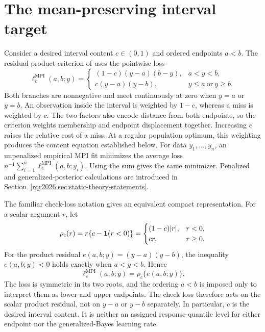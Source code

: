 \section{The mean-preserving interval target}
\label{rqr2026:sec:mpi-loss}

Consider a desired interval content \(c\in(0,1)\) and ordered endpoints
\(a<b\). The residual-product criterion of
\citet{rqr-PouplinEtAl2024RQR} uses the pointwise loss
\begin{equation}
\ell_c^{\mathrm{MPI}}(a,b;y)=
\begin{cases}
(1-c)(y-a)(b-y), & a<y<b,\\
c(y-a)(y-b), & y\le a\ \text{or}\ y\ge b.
\end{cases}
\label{rqr2026:eq:mpi-loss-piecewise}
\end{equation}
Both branches are nonnegative and meet continuously at zero when \(y=a\) or
\(y=b\). An observation inside the interval is weighted by \(1-c\), whereas a
miss is weighted by \(c\). The two factors also encode distance from both
endpoints, so the criterion weights membership and endpoint displacement
together. Increasing \(c\) raises the relative cost of a miss. At a regular
population optimum, this weighting produces the content equation established
below. For data \(y_1,\ldots,y_n\), an unpenalized empirical MPI fit minimizes
the average loss
\(n^{-1}\sum_{i=1}^n\ell_c^{\mathrm{MPI}}(a,b;y_i)\). Using the sum gives the
same minimizer. Penalized and generalized-posterior calculations are introduced
in Section~\ref{rqr2026:sec:static-theory-statements}.

The familiar check-loss notation gives an equivalent compact representation.
For a scalar argument \(r\), let
\[
\rho_c(r)=r\{c-\mathbf{1}(r<0)\}
=
\begin{cases}
(1-c)|r|, & r<0,\\
cr, & r\ge0.
\end{cases}
\]
For the product residual \(e(a,b;y)=(y-a)(y-b)\), the inequality
\(e(a,b;y)<0\) holds exactly when \(a<y<b\). Hence
\begin{equation}
\ell_c^{\mathrm{MPI}}(a,b;y)=\rho_c\{e(a,b;y)\}.
\label{rqr2026:eq:mpi-product-check}
\end{equation}
The loss is symmetric in its two roots, and the ordering \(a<b\) is imposed only
to interpret them as lower and upper endpoints.
The check loss therefore acts on the scalar product residual, not on
\(y-a\) or \(y-b\) separately. In particular, \(c\) is the desired interval
content. It is neither an assigned response-quantile level for either endpoint
nor the generalized-Bayes learning rate.

